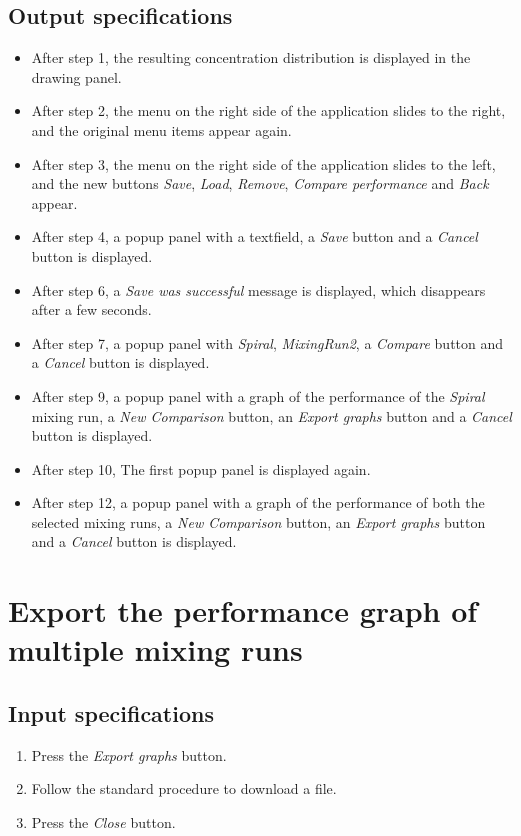 \subsection*{Output specifications}
\begin{itemize}
\item After step 1, the resulting concentration distribution is displayed in the drawing panel.
\item After step 2, the menu on the right side of the application slides to the right, and the original menu items appear again.
\item After step 3, the menu on the right side of the application slides to the left, and the new buttons \emph{Save}, \emph{Load}, \emph{Remove}, \emph{Compare performance} and \emph{Back} appear.
\item After step 4, a popup panel with a textfield, a \emph{Save} button and a \emph{Cancel} button is displayed.

\item After step 6, a \emph{Save was successful} message is displayed, which disappears after a few seconds.
\item After step 7, a popup panel with \emph{Spiral}, \emph{MixingRun2}, a \emph{Compare} button and a \emph{Cancel} button is displayed.
\item After step 9, a popup panel with a graph of the performance of the \emph{Spiral} mixing run, a \emph{New Comparison} button, an \emph{Export graphs} button and a \emph{Cancel} button is displayed.
\item After step 10, The first popup panel is displayed again.

\item After step 12, a popup panel with a graph of the performance of both the selected mixing runs, a \emph{New Comparison} button, an \emph{Export graphs} button and a \emph{Cancel} button is displayed.
\end{itemize}

\section{Export the performance graph of multiple mixing runs}

\subsection*{Input specifications}
\begin{enumerate}
\item Press the \emph{Export graphs} button.
\item Follow the standard procedure to download a file.
\item Press the \emph{Close} button.
\end{enumerate}

